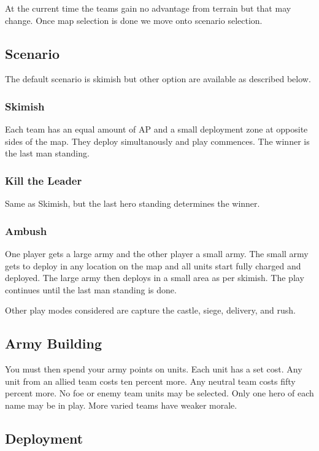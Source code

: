 \documentclass[a4paper]{article}
\begin{document}
At the current time the teams gain no advantage from terrain but that may change. Once map selection is done we move onto scenario selection.

\subsection{Scenario}

The default scenario is skimish but other option are available as described below.

\subsubsection{Skimish}

Each team has an equal amount of AP and a small deployment zone at opposite sides of the map. They deploy simultanously and play commences. The winner is the last man standing.

\subsubsection{Kill the Leader}

Same as Skimish, but the last hero standing determines the winner.

\subsubsection{Ambush}

One player gets a large army and the other player a small army. The small army gets to deploy in any location on the map and all units start fully charged and deployed. The large army then deploys in a small area as per skimish. The play continues until the last man standing is done.

Other play modes considered are capture the castle, siege, delivery, and rush.

\subsection{Army Building}

You must then spend your army points on units. Each unit has a set cost. Any unit from an allied team costs ten percent more. Any neutral team costs fifty percent more. No foe or enemy team units may be selected. Only one hero of each name may be in play. More varied teams have weaker morale.

\subsection{Deployment}
\end{document}
